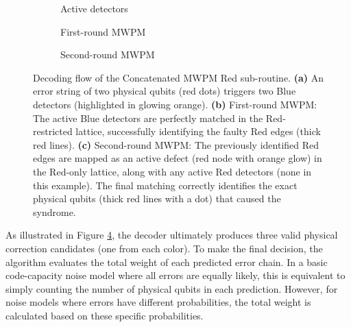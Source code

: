 \begin{figure}[hbt!]
    \centering
    \begin{subfigure}[b]{0.32\textwidth}
        \centering
        \resizebox{\linewidth}{!}{
            
        }
        \caption{Active detectors}
        \label{fig:concat_exec_syndrome}
    \end{subfigure}
    \hfill
    \begin{subfigure}[b]{0.32\textwidth}
        \centering
        \resizebox{\linewidth}{!}{
            
        }
        \caption{First-round MWPM}
        \label{fig:concat_exec_mwpm1}
    \end{subfigure}
    \hfill
    \begin{subfigure}[b]{0.32\textwidth}
        \centering
        \resizebox{\linewidth}{!}{
            
        }
        \caption{Second-round MWPM}
        \label{fig:concat_exec_mwpm2}
    \end{subfigure}
    
    \caption[Decoding flow of the Concatenated MWPM Red sub-routine.]{Decoding flow of the Concatenated MWPM Red sub-routine. \textbf{(a)} An error string of two physical qubits (red dots) triggers two Blue detectors (highlighted in glowing orange). \textbf{(b)} First-round MWPM: The active Blue detectors are perfectly matched in the Red-restricted lattice, successfully identifying the faulty Red edges (thick red lines). \textbf{(c)} Second-round MWPM: The previously identified Red edges are mapped as an active defect (red node with orange glow) in the Red-only lattice, along with any active Red detectors (none in this example). The final matching correctly identifies the exact physical qubits (thick red lines with a dot) that caused the syndrome.}
    \label{fig:4:concatenated_execution}
\end{figure}

As illustrated in Figure \ref{fig:4:concatenated_execution}, the decoder ultimately produces three valid physical correction candidates (one from each color). To make the final decision, the algorithm evaluates the total weight of each predicted error chain. In a basic code-capacity noise model where all errors are equally likely, this is equivalent to simply counting the number of physical qubits in each prediction. However, for noise models where errors have different probabilities, the total weight is calculated based on these specific probabilities. 

